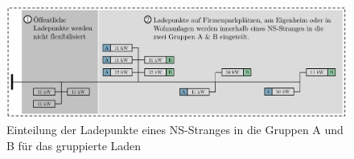 \begin{figure}[H]
    \centering
    \includegraphics[width=\textwidth]{Bilder/grouped_charging_vis_cropped}
    \caption{Einteilung der Ladepunkte eines NS-Stranges in die Gruppen A und B für das gruppierte Laden}\label{fig:group_vis}
\end{figure}
